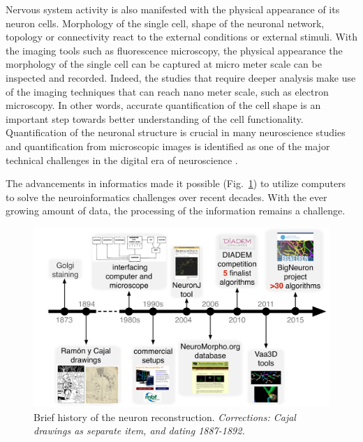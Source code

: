 Nervous system activity is also manifested with the physical appearance of its neuron cells. Morphology of the single cell, shape of the neuronal network, topology or connectivity react to the external conditions or external stimuli. With the imaging tools such as fluorescence microscopy, the physical appearance the morphology of the single cell can be captured at micro meter scale can be inspected and recorded. Indeed, the studies that require deeper analysis make use of the imaging techniques that can reach nano meter scale, such as electron microscopy. In other words, accurate quantification of the cell shape is an important step towards better understanding of the cell functionality. Quantification of the neuronal structure is crucial in many neuroscience studies \cite{halavi2012digital} and quantification from microscopic images is identified as one of the major technical challenges in the digital era of neuroscience \cite{peng2015diadem}.

The advancements in informatics made it possible (Fig.~\ref{ch1__fig1}) to utilize computers to solve the neuroinformatics challenges over recent decades. With the ever growing amount of data, the processing of the information remains a challenge.   

\begin{figure}
	\begin{center}
		\includegraphics[width=\textwidth]{ch1_fig1}
	\end{center}
	\vspace{-3ex}
	\caption{Brief history of the neuron reconstruction. \textit{Corrections: Cajal drawings as separate item, and dating 1887-1892.}}
	\vspace{-1ex}
	\label{ch1__fig1}
\end{figure}

